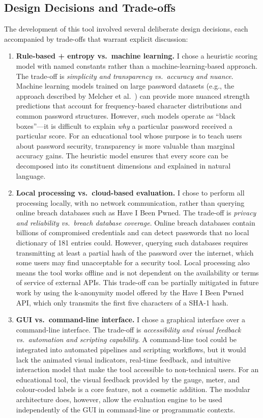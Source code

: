 \subsection{Design Decisions and Trade-offs}

The development of this tool involved several deliberate design decisions, each accompanied by trade-offs that warrant explicit discussion:

\begin{enumerate}
    \item \textbf{Rule-based + entropy vs.\ machine learning.} I chose a heuristic scoring model with named constants rather than a machine-learning-based approach. The trade-off is \textit{simplicity and transparency vs.\ accuracy and nuance}. Machine learning models trained on large password datasets (e.g., the approach described by Melcher et al.\ \cite{melcher2016}) can provide more nuanced strength predictions that account for frequency-based character distributions and common password structures. However, such models operate as ``black boxes''---it is difficult to explain \textit{why} a particular password received a particular score. For an educational tool whose purpose is to teach users about password security, transparency is more valuable than marginal accuracy gains. The heuristic model ensures that every score can be decomposed into its constituent dimensions and explained in natural language.

    \item \textbf{Local processing vs.\ cloud-based evaluation.} I chose to perform all processing locally, with no network communication, rather than querying online breach databases such as Have I Been Pwned. The trade-off is \textit{privacy and reliability vs.\ breach database coverage}. Online breach databases contain billions of compromised credentials and can detect passwords that no local dictionary of 181 entries could. However, querying such databases requires transmitting at least a partial hash of the password over the internet, which some users may find unacceptable for a security tool. Local processing also means the tool works offline and is not dependent on the availability or terms of service of external APIs. This trade-off can be partially mitigated in future work by using the k-anonymity model offered by the Have I Been Pwned API, which only transmits the first five characters of a SHA-1 hash.

    \item \textbf{GUI vs.\ command-line interface.} I chose a graphical interface over a command-line interface. The trade-off is \textit{accessibility and visual feedback vs.\ automation and scripting capability}. A command-line tool could be integrated into automated pipelines and scripting workflows, but it would lack the animated visual indicators, real-time feedback, and intuitive interaction model that make the tool accessible to non-technical users. For an educational tool, the visual feedback provided by the gauge, meter, and colour-coded labels is a core feature, not a cosmetic addition. The modular architecture does, however, allow the evaluation engine to be used independently of the GUI in command-line or programmatic contexts.


\end{enumerate}
